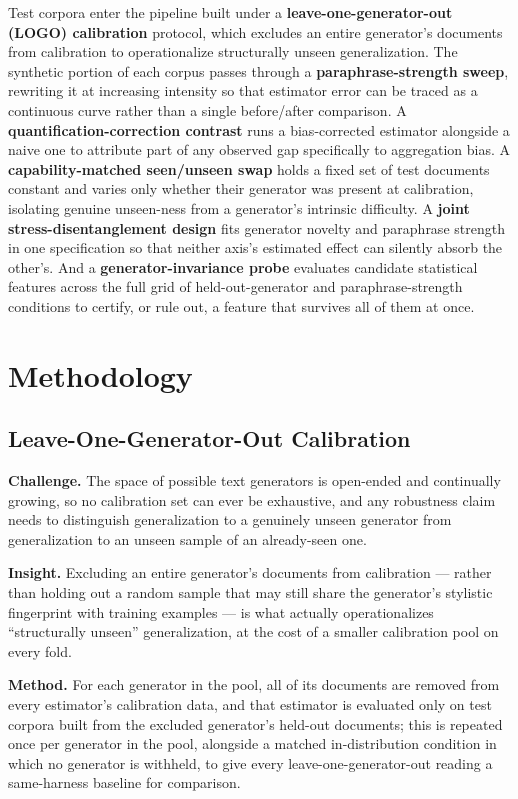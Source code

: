 \documentclass[11pt]{article}
\begin{document}
Test corpora enter the pipeline built under a \textbf{leave-one-generator-out (LOGO) calibration} protocol, which excludes an entire generator's documents from calibration to operationalize structurally unseen generalization. The synthetic portion of each corpus passes through a \textbf{paraphrase-strength sweep}, rewriting it at increasing intensity so that estimator error can be traced as a continuous curve rather than a single before/after comparison. A \textbf{quantification-correction contrast} runs a bias-corrected estimator alongside a naive one to attribute part of any observed gap specifically to aggregation bias. A \textbf{capability-matched seen/unseen swap} holds a fixed set of test documents constant and varies only whether their generator was present at calibration, isolating genuine unseen-ness from a generator's intrinsic difficulty. A \textbf{joint stress-disentanglement design} fits generator novelty and paraphrase strength in one specification so that neither axis's estimated effect can silently absorb the other's. And a \textbf{generator-invariance probe} evaluates candidate statistical features across the full grid of held-out-generator and paraphrase-strength conditions to certify, or rule out, a feature that survives all of them at once.

\section{Methodology}

\subsection{Leave-One-Generator-Out Calibration}
\textbf{Challenge.} The space of possible text generators is open-ended and continually growing, so no calibration set can ever be exhaustive, and any robustness claim needs to distinguish generalization to a genuinely unseen generator from generalization to an unseen sample of an already-seen one.

\textbf{Insight.} Excluding an entire generator's documents from calibration --- rather than holding out a random sample that may still share the generator's stylistic fingerprint with training examples --- is what actually operationalizes ``structurally unseen'' generalization, at the cost of a smaller calibration pool on every fold.

\textbf{Method.} For each generator in the pool, all of its documents are removed from every estimator's calibration data, and that estimator is evaluated only on test corpora built from the excluded generator's held-out documents; this is repeated once per generator in the pool, alongside a matched in-distribution condition in which no generator is withheld, to give every leave-one-generator-out reading a same-harness baseline for comparison.
\end{document}
